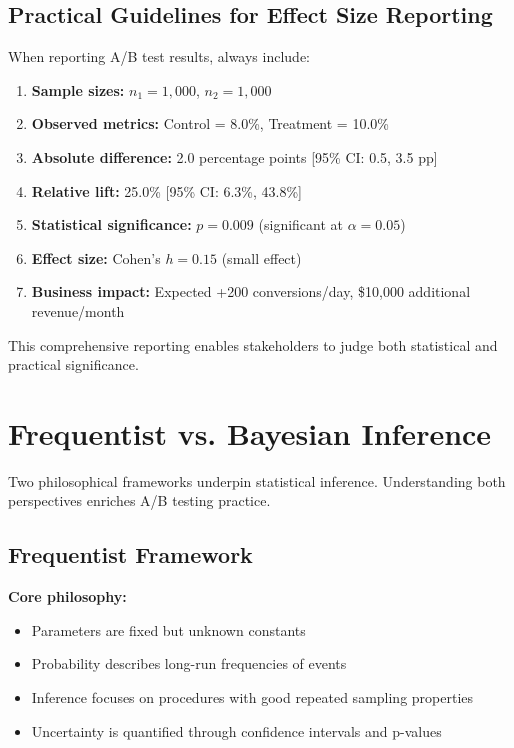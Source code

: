 \subsection{Practical Guidelines for Effect Size Reporting}

When reporting A/B test results, always include:

\begin{enumerate}
    \item \textbf{Sample sizes:} $n_1 = 1,000$, $n_2 = 1,000$

    \item \textbf{Observed metrics:} Control = 8.0\%, Treatment = 10.0\%

    \item \textbf{Absolute difference:} 2.0 percentage points [95\% CI: 0.5, 3.5 pp]

    \item \textbf{Relative lift:} 25.0\% [95\% CI: 6.3\%, 43.8\%]

    \item \textbf{Statistical significance:} $p = 0.009$ (significant at $\alpha = 0.05$)

    \item \textbf{Effect size:} Cohen's $h = 0.15$ (small effect)

    \item \textbf{Business impact:} Expected +200 conversions/day, \$10,000 additional revenue/month
\end{enumerate}

This comprehensive reporting enables stakeholders to judge both statistical and practical significance.

\section{Frequentist vs. Bayesian Inference}

Two philosophical frameworks underpin statistical inference. Understanding both perspectives enriches A/B testing practice.

\subsection{Frequentist Framework}

\textbf{Core philosophy:}
\begin{itemize}
    \item Parameters are fixed but unknown constants
    \item Probability describes long-run frequencies of events
    \item Inference focuses on procedures with good repeated sampling properties
    \item Uncertainty is quantified through confidence intervals and p-values
\end{itemize}

